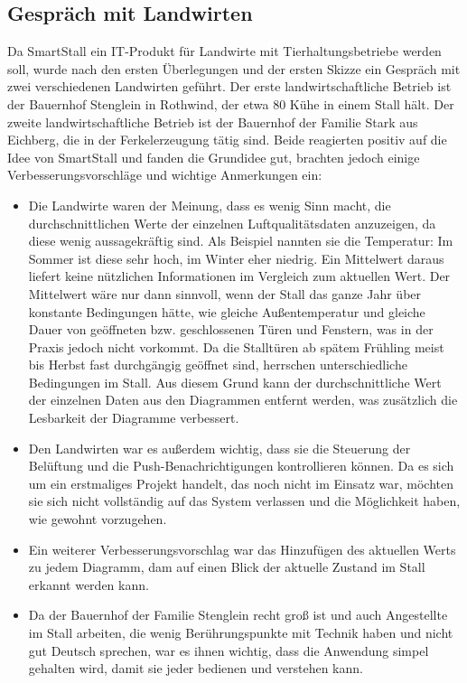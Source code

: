 \documentclass[conference]{IEEEtran}
\begin{document}
\subsection{Gespräch mit Landwirten}
Da SmartStall ein IT-Produkt für Landwirte mit Tierhaltungsbetriebe werden soll, wurde nach den ersten Überlegungen und der ersten Skizze ein Gespräch mit zwei verschiedenen Landwirten geführt. Der erste landwirtschaftliche Betrieb ist der Bauernhof Stenglein in Rothwind, der etwa 80 Kühe in einem Stall hält. Der zweite landwirtschaftliche Betrieb ist der Bauernhof der Familie Stark aus Eichberg, die in der Ferkelerzeugung tätig sind. Beide reagierten positiv auf die Idee von SmartStall und fanden die Grundidee gut, brachten jedoch einige Verbesserungsvorschläge und wichtige Anmerkungen ein: 
\begin{itemize}
\item Die Landwirte waren der Meinung, dass es wenig Sinn macht, die durchschnittlichen Werte der einzelnen Luftqualitätsdaten anzuzeigen, da diese wenig aussagekräftig sind. Als Beispiel nannten sie die Temperatur: Im Sommer ist diese sehr hoch, im Winter eher niedrig. Ein Mittelwert daraus liefert keine nützlichen Informationen im Vergleich zum aktuellen Wert. Der Mittelwert wäre nur dann sinnvoll, wenn der Stall das ganze Jahr über konstante Bedingungen hätte, wie gleiche Außentemperatur und gleiche Dauer von geöffneten bzw. geschlossenen Türen und Fenstern, was in der Praxis jedoch nicht vorkommt. Da die Stalltüren ab spätem Frühling meist bis Herbst fast durchgängig geöffnet sind, herrschen unterschiedliche Bedingungen im Stall. Aus diesem Grund kann der durchschnittliche Wert der einzelnen Daten aus den Diagrammen entfernt werden, was zusätzlich die Lesbarkeit der Diagramme verbessert.
\item Den Landwirten war es außerdem wichtig, dass sie die Steuerung der Belüftung und die Push-Benachrichtigungen kontrollieren können. Da es sich um ein erstmaliges Projekt handelt, das noch nicht im Einsatz war, möchten sie sich nicht vollständig auf das System verlassen und die Möglichkeit haben, wie gewohnt vorzugehen. 
\item Ein weiterer Verbesserungsvorschlag war das Hinzufügen des aktuellen Werts zu jedem Diagramm, dam auf einen Blick der aktuelle Zustand im Stall erkannt werden kann.
\item Da der Bauernhof der Familie Stenglein recht groß ist und auch Angestellte im Stall arbeiten, die wenig Berührungspunkte mit Technik haben und nicht gut Deutsch sprechen, war es ihnen wichtig, dass die Anwendung simpel gehalten wird, damit sie jeder bedienen und verstehen kann.
\end{itemize}
\end{document}
